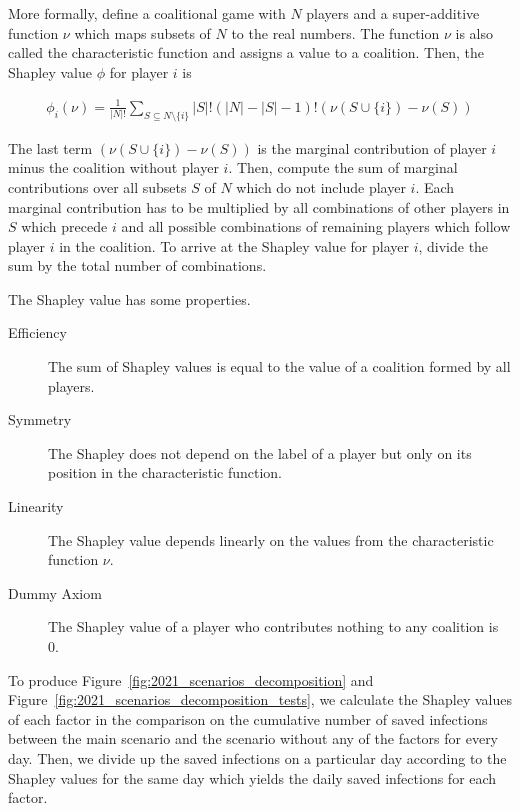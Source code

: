 More formally, define a coalitional game with $N$ players and a super-additive function
$\nu$ which maps subsets of $N$ to the real numbers. The function $\nu$ is also called
the characteristic function and assigns a value to a coalition. Then, the Shapley value
$\phi$ for player $i$ is

\begin{align*}
    \phi_i(\nu) = \frac{1}{|N| !} \sum_{S \subseteq N \setminus \{i\}} |S| ! (|N| - |S| - 1)! (\nu(S \cup \{i\}) - \nu(S))
\end{align*}

The last term $(\nu(S \cup \{i\}) - \nu(S))$ is the marginal contribution of player $i$
minus the coalition without player $i$. Then, compute the sum of marginal contributions
over all subsets $S$ of $N$ which do not include player $i$. Each marginal contribution
has to be multiplied by all combinations of other players in $S$ which precede $i$ and
all possible combinations of remaining players which follow player $i$ in the coalition.
To arrive at the Shapley value for player $i$, divide the sum by the total number of
combinations.

The Shapley value has some properties.

\begin{description}
  \item[Efficiency] The sum of Shapley values is equal to the value of a coalition
  formed by all players.
  \item[Symmetry] The Shapley does not depend on the label of a player but only on its
  position in the characteristic function.
  \item[Linearity] The Shapley value depends linearly on the values from the
  characteristic function $\nu$.
  \item[Dummy Axiom] The Shapley value of a player who contributes nothing to any
  coalition is 0.
\end{description}

To produce Figure~\ref{fig:2021_scenarios_decomposition} and
Figure~\ref{fig:2021_scenarios_decomposition_tests}, we calculate the Shapley values of
each factor in the comparison on the cumulative number of saved infections between the
main scenario and the scenario without any of the factors for every day. Then, we divide
up the saved infections on a particular day according to the Shapley values for the same
day which yields the daily saved infections for each factor.


